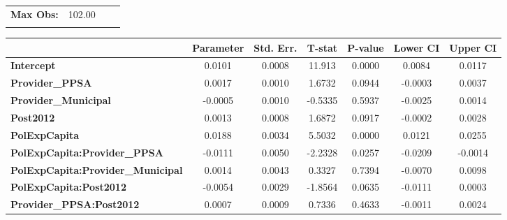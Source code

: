 \begin{center}
\begin{tabular}{lclc}
\textbf{Max Obs:}                                  &       102.00       & \textbf{                     }   &                  \\
\textbf{}                                          &                    & \textbf{                     }   &                  \\
\bottomrule
\end{tabular}
\begin{tabular}{lcccccc}
                                                   & \textbf{Parameter} & \textbf{Std. Err.} & \textbf{T-stat} & \textbf{P-value} & \textbf{Lower CI} & \textbf{Upper CI}  \\
\midrule
\textbf{Intercept}                                 &       0.0101       &       0.0008       &      11.913     &      0.0000      &       0.0084      &       0.0117       \\
\textbf{Provider\_PPSA}                            &       0.0017       &       0.0010       &      1.6732     &      0.0944      &      -0.0003      &       0.0037       \\
\textbf{Provider\_Municipal}                       &      -0.0005       &       0.0010       &     -0.5335     &      0.5937      &      -0.0025      &       0.0014       \\
\textbf{Post2012}                                  &       0.0013       &       0.0008       &      1.6872     &      0.0917      &      -0.0002      &       0.0028       \\
\textbf{PolExpCapita}                              &       0.0188       &       0.0034       &      5.5032     &      0.0000      &       0.0121      &       0.0255       \\
\textbf{PolExpCapita:Provider\_PPSA}               &      -0.0111       &       0.0050       &     -2.2328     &      0.0257      &      -0.0209      &      -0.0014       \\
\textbf{PolExpCapita:Provider\_Municipal}          &       0.0014       &       0.0043       &      0.3327     &      0.7394      &      -0.0070      &       0.0098       \\
\textbf{PolExpCapita:Post2012}                     &      -0.0054       &       0.0029       &     -1.8564     &      0.0635      &      -0.0111      &       0.0003       \\
\textbf{Provider\_PPSA:Post2012}                   &       0.0007       &       0.0009       &      0.7336     &      0.4633      &      -0.0011      &       0.0024       \\

\end{tabular}
\end{center}
